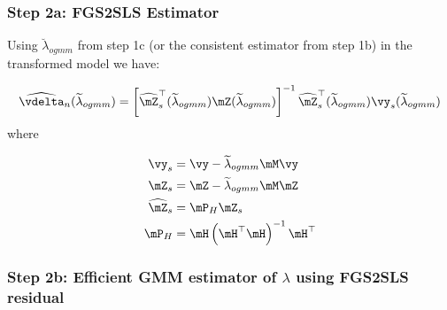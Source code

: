 \documentclass[english,12pt]{book}\usepackage[]{graphicx}\usepackage[]{xcolor}
\begin{document}
% 
% 
% 
% 


\subsubsection{Step 2a: FGS2SLS Estimator}

Using $\breve{\lambda}_{ogmm}$ from step 1c (or the consistent estimator from step 1b) in the transformed model we have:

\begin{equation}
  \widehat{\vdelta}_n(\widetilde{\lambda}_{ogmm} ) = \left[\widehat{\mZ}_{s}^\top(\widetilde{\lambda}_{ogmm}) \mZ(\widetilde{\lambda}_{ogmm})\right]^{-1}  \widehat{\mZ}_{s}^\top(\widetilde{\lambda}_{ogmm}) \vy_s(\widetilde{\lambda}_{ogmm})
\end{equation}
%
where

\begin{equation}
  \begin{aligned}
    \vy_s & = \vy - \widetilde{\lambda}_{ogmm}\mM\vy \\
    \mZ_s & = \mZ - \widetilde{\lambda}_{ogmm}\mM\mZ \\
    \widehat{\mZ}_s & = \mP_H\mZ_s \\
    \mP_H & = \mH\left(\mH^\top\mH\right)^{-1}\mH^\top
  \end{aligned}
\end{equation}


\subsubsection{Step 2b: Efficient GMM estimator of $\lambda$ using FGS2SLS  residual}
\end{document}
